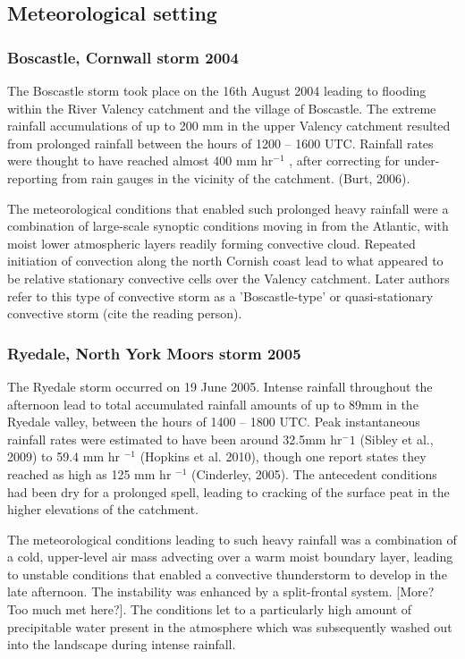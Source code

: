 \subsection{Meteorological setting}

\subsubsection{Boscastle, Cornwall storm 2004}
The Boscastle storm took place on the 16th August 2004 leading to flooding within the River Valency catchment and the village of Boscastle. The extreme rainfall accumulations of up to 200 mm in the upper Valency catchment resulted from prolonged rainfall between the hours of 1200 -- 1600 UTC. Rainfall rates were thought to have reached almost 400 mm hr\(^{-1}\) \citep{Golding2006}, after correcting for under-reporting from rain gauges in the vicinity of the catchment. (Burt, 2006).

The meteorological conditions that enabled such prolonged heavy rainfall were a combination of large-scale synoptic conditions moving in from the Atlantic, with moist lower atmospheric layers readily forming convective cloud. Repeated initiation of convection along the north Cornish coast lead to what appeared to be relative stationary convective cells over the Valency catchment. Later authors refer to this type of convective storm as a 'Boscastle-type' or quasi-stationary convective storm (cite the reading person).

\subsubsection{Ryedale, North York Moors storm 2005}
The Ryedale storm occurred on 19 June 2005. Intense rainfall throughout the afternoon lead to total accumulated rainfall amounts of up to 89mm in the Ryedale valley, between the hours of 1400 -- 1800 UTC. Peak instantaneous rainfall rates were estimated to have been around 32.5mm hr\(^-1\) (Sibley et al., 2009) to 59.4 mm hr \(^{-1}\) (Hopkins et al. 2010), though one report states they reached as high as 125 mm hr \(^{-1}\) (Cinderley, 2005). The antecedent conditions had been dry for a prolonged spell, leading to cracking of the surface peat in the higher elevations of the catchment.

The meteorological conditions leading to such heavy rainfall was a combination of a cold, upper-level air mass advecting over a warm moist boundary layer, leading to unstable conditions that enabled a convective thunderstorm to develop in the late afternoon. The instability was enhanced by a split-frontal system. [More? Too much met here?]. The conditions let to a particularly high amount of precipitable water present in the atmosphere which was subsequently washed out into the landscape during intense rainfall. 


